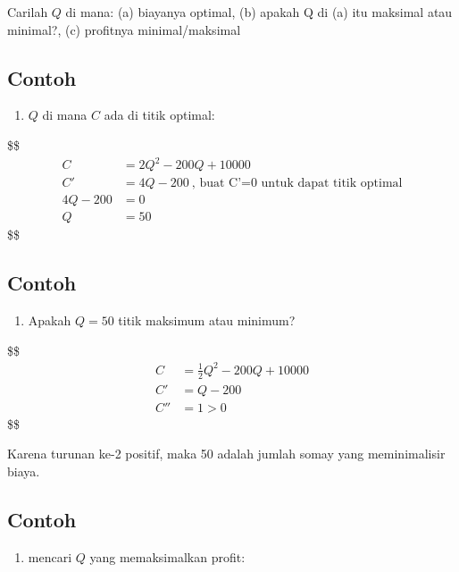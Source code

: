 \documentclass[
  letterpaper,
  DIV=11,
  numbers=noendperiod]{scrartcl}
\providecommand{\tightlist}{%
  \setlength{\itemsep}{0pt}\setlength{\parskip}{0pt}}\usepackage{longtable,booktabs,array}
\begin{document}
Carilah \(Q\) di mana: (a) biayanya optimal, (b) apakah Q di (a) itu
maksimal atau minimal?, (c) profitnya minimal/maksimal

\hypertarget{contoh-8}{%
\subsection{Contoh}\label{contoh-8}}

\begin{enumerate}
\def\labelenumi{\alph{enumi}.}
\tightlist
\item
  \(Q\) di mana \(C\) ada di titik optimal:
\end{enumerate}

\$\$ \begin{align}
C&=2Q^2-200Q+10000 \\
C'&=4Q-200 \ \text{, buat C'=0 untuk dapat titik optimal} \\
4Q-200&=0\\
Q&=50

\end{align} \$\$

\hypertarget{contoh-9}{%
\subsection{Contoh}\label{contoh-9}}

\begin{enumerate}
\def\labelenumi{\alph{enumi}.}
\setcounter{enumi}{1}
\tightlist
\item
  Apakah \(Q=50\) titik maksimum atau minimum?
\end{enumerate}

\$\$ \begin{align}
C&=\frac{1}{2}Q^2-200Q+10000 \\
C'&=Q-200 \\
C''&=1 >0

\end{align} \$\$

Karena turunan ke-2 positif, maka 50 adalah jumlah somay yang
meminimalisir biaya.

\hypertarget{contoh-10}{%
\subsection{Contoh}\label{contoh-10}}

\begin{enumerate}
\def\labelenumi{\alph{enumi}.}
\setcounter{enumi}{2}
\tightlist
\item
  mencari \(Q\) yang memaksimalkan profit:
\end{enumerate}
\end{document}
